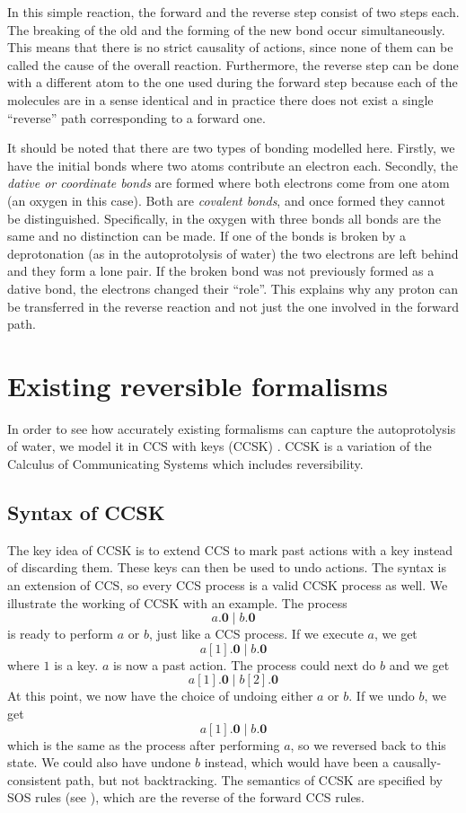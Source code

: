 \documentclass[runningheads]{llncs}
\newcommand{\paral}{\; \vert \;}
\newcommand{\Nil}{\mathbf{0}}
\begin{document}
In this simple reaction, the forward and the reverse step consist of two steps each. The breaking of the old and the forming of the new bond occur simultaneously. This means that there is no strict causality of actions, since none of them can be called the cause of the overall reaction. Furthermore, the reverse step can be done with a different atom to the one used during the forward step because each of the molecules are in a sense identical and in practice there does not exist a single ``reverse'' path corresponding to a forward one.%

It should be noted that there are two types of bonding modelled here. Firstly, we have the initial bonds where two atoms contribute an electron each. Secondly, the \emph{dative or coordinate bonds} are formed where both electrons come from one atom (an oxygen in this case). Both are \emph{covalent bonds}, and once formed they cannot be distinguished. Specifically, in the oxygen with three bonds all bonds are the same and no distinction can be made. If one of the bonds is broken by a deprotonation (as in the autoprotolysis of water) the two electrons are left behind and they form a lone pair. If the broken bond was not previously formed as a dative bond, the electrons changed their ``role''. This explains why any proton can be transferred in the reverse reaction and not just the one involved in the forward path.

\section{Existing reversible formalisms}
In order to see how accurately existing formalisms can capture the autoprotolysis of water, we model it in CCS with keys (CCSK) \cite{Irek2007}. CCSK is a variation of the Calculus of Communicating Systems which includes reversibility. 

\subsection{Syntax of CCSK}

The key idea of CCSK is to extend CCS to mark past actions with a key instead of discarding them. These keys can then be used to undo actions. The syntax is an extension of CCS, so every CCS process is a valid CCSK process as well. We illustrate the working of CCSK with an example. The process
%
$$a.\Nil \paral b.\Nil$$
%
is ready to perform $a$ or $b$, just like a CCS process. If we execute $a$, we get
%
$$a[1].\Nil \paral b.\Nil$$
%
where $1$ is a key. $a$ is now a past action. The process could next do $b$ and we get
%
$$a[1].\Nil \paral b[2].\Nil$$
%
At this point, we now have the choice of undoing either $a$ or $b$. If we undo $b$, we get
%
$$a[1].\Nil \paral b.\Nil$$
%
which is the same as the process after performing $a$, so we reversed back to this state. We could also have undone $b$ instead, which would have been a causally-consistent path, but not backtracking. The semantics of CCSK are specified by SOS rules (see \cite{Irek2007}), which are the reverse of the forward CCS rules.
\end{document}
